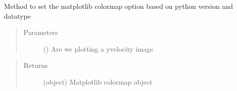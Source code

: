 \documentclass[letterpaper,10pt,english]{sphinxmanual}
\begin{document}
\begin{fulllineitems}
\label{\detokenize{index:lb_colloids.LB.LB_pretty.set_colormap}}
Method to set the matplotlib colormap option based
on python version and datatype
\begin{quote}\begin{description}
\item[{Parameters}] \leavevmode
{} () \textendash{} Are we plotting a yvelocity image

\end{description}\end{quote}
\begin{quote}\begin{description}
\item[{Returns}] \leavevmode
(object) Matplotlib colormap object

\end{description}\end{quote}

\end{fulllineitems}

\end{document}
